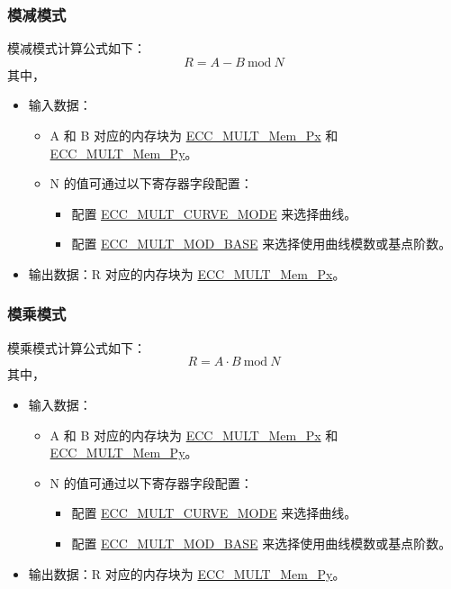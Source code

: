\documentclass[main\_\_CN.tex]{subfiles}
\begin{document}
\subsubsection{模减模式}
模减模式计算公式如下：
\[
R = A - B \ \textrm{mod}\ N
\]
其中，
\begin{itemize}
    \item 输入数据：
    \begin{itemize}
        \item A 和 B 对应的内存块为 \hyperref[tab:ecc-memory]{ECC\_MULT\_Mem\_Px} 和 \hyperref[tab:ecc-memory]{ECC\_MULT\_Mem\_Py}。
        \item N 的值可通过以下寄存器字段配置：
        \begin{itemize}
            \item 配置 \hyperref[fielddesc:ECCMULTCURVEMODE]{ECC\_MULT\_CURVE\_MODE} 来选择曲线。
            \item 配置 \hyperref[fielddesc:ECCMULTMODBASE]{ECC\_MULT\_MOD\_BASE} 来选择使用曲线模数或基点阶数。
        \end{itemize}
    \end{itemize}
    \item 输出数据：R 对应的内存块为 \hyperref[tab:ecc-memory]{ECC\_MULT\_Mem\_Px}。
\end{itemize}

\subsubsection{模乘模式}
模乘模式计算公式如下：
\[
R = A \cdot B \ \textrm{mod}\ N
\]
其中，
\begin{itemize}
    \item 输入数据：
    \begin{itemize}
        \item A 和 B 对应的内存块为 \hyperref[tab:ecc-memory]{ECC\_MULT\_Mem\_Px} 和 \hyperref[tab:ecc-memory]{ECC\_MULT\_Mem\_Py}。
        \item N 的值可通过以下寄存器字段配置：
        \begin{itemize}
            \item 配置 \hyperref[fielddesc:ECCMULTCURVEMODE]{ECC\_MULT\_CURVE\_MODE} 来选择曲线。
            \item 配置 \hyperref[fielddesc:ECCMULTMODBASE]{ECC\_MULT\_MOD\_BASE} 来选择使用曲线模数或基点阶数。
        \end{itemize}
    \end{itemize}
    \item 输出数据：R 对应的内存块为 \hyperref[tab:ecc-memory]{ECC\_MULT\_Mem\_Py}。
\end{itemize}
\end{document}
